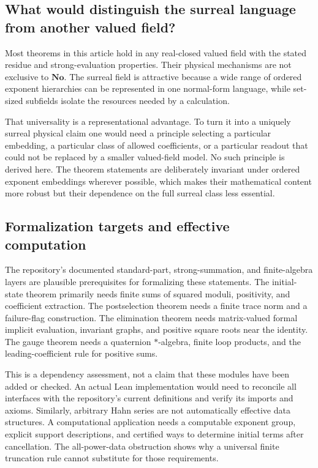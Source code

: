 \documentclass[11pt,oneside]{article}
\numberwithin{equation}{section}
\theoremstyle{plain}
\theoremstyle{definition}
\theoremstyle{remark}
\newcommand{\No}{\mathbf{No}}
\begin{document}
\subsection{What would distinguish the surreal language from another valued field?}
Most theorems in this article hold in any real-closed valued field with the stated residue and strong-evaluation properties. Their physical mechanisms are not exclusive to $\No$. The surreal field is attractive because a wide range of ordered exponent hierarchies can be represented in one normal-form language, while set-sized subfields isolate the resources needed by a calculation.

That universality is a representational advantage. To turn it into a uniquely surreal physical claim one would need a principle selecting a particular embedding, a particular class of allowed coefficients, or a particular readout that could not be replaced by a smaller valued-field model. No such principle is derived here. The theorem statements are deliberately invariant under ordered exponent embeddings wherever possible, which makes their mathematical content more robust but their dependence on the full surreal class less essential.

\subsection{Formalization targets and effective computation}
The repository's documented standard-part, strong-summation, and finite-algebra layers are plausible prerequisites for formalizing these statements. The initial-state theorem primarily needs finite sums of squared moduli, positivity, and coefficient extraction. The postselection theorem needs a finite trace norm and a failure-flag construction. The elimination theorem needs matrix-valued formal implicit evaluation, invariant graphs, and positive square roots near the identity. The gauge theorem needs a quaternion $*$-algebra, finite loop products, and the leading-coefficient rule for positive sums.

This is a dependency assessment, not a claim that these modules have been added or checked. An actual Lean implementation would need to reconcile all interfaces with the repository's current definitions and verify its imports and axioms. Similarly, arbitrary Hahn series are not automatically effective data structures. A computational application needs a computable exponent group, explicit support descriptions, and certified ways to determine initial terms after cancellation. The all-power-data obstruction shows why a universal finite truncation rule cannot substitute for those requirements.
\end{document}
